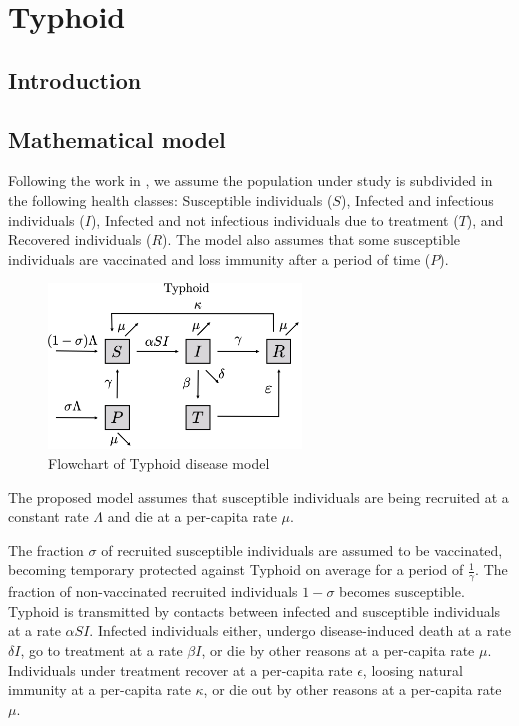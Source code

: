 \documentclass{book}
\begin{document}

\section{Typhoid}
\subsection*{Introduction}
\subsection*{Mathematical model}
Following the work in \cite{peter2017mathematical}, we assume the population under study is subdivided in the following health classes: Susceptible individuals ($S$), Infected and infectious individuals ($I$), Infected and not infectious individuals due to treatment ($T$), and Recovered individuals ($R$). The model also assumes that some susceptible individuals are vaccinated and loss immunity after a period of time ($P$).

\begin{figure}[H]
    \centering
    \includegraphics[width = 0.6\textwidth]{Flowcharts/typhoid.png}
    \caption{Flowchart of Typhoid disease model}
    \label{fig:typhoid_flow}
\end{figure}

The proposed model assumes that susceptible individuals are being recruited at a constant rate $\Lambda$ and die at a per-capita rate $\mu$.

The fraction $\sigma$ of recruited susceptible individuals are assumed to be vaccinated, becoming temporary protected against Typhoid on average for a period of $\frac{1}{\gamma}$. The fraction of non-vaccinated recruited individuals $1-\sigma$ becomes susceptible. Typhoid is transmitted by contacts between infected and susceptible individuals at a rate $\alpha S I$. 
%
Infected individuals either, undergo disease-induced death at a rate $\delta I$, go to treatment at a rate $\beta I$, or die by other reasons at a per-capita rate $\mu$.
%
Individuals under treatment recover at a per-capita rate $\epsilon$, loosing natural immunity at a per-capita rate $\kappa$, or die out by other reasons at a per-capita rate $\mu$.
%
\end{document}
